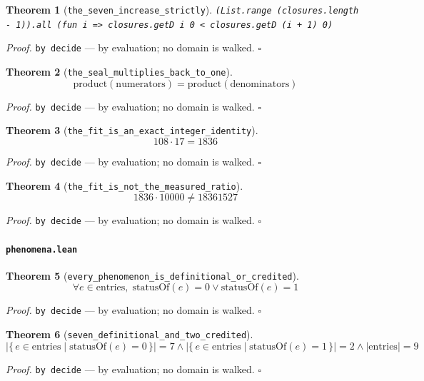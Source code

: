 \documentclass[11pt]{article}
\newtheorem{theorem}{Theorem}[section]
\begin{document}
\begin{theorem}[\texttt{the\_seven\_increase\_strictly}]
\texttt{(List.range (closures.length - 1)).all (fun i => closures.getD i 0 < closures.getD (i + 1) 0)}
\end{theorem}
\noindent\emph{Proof.} \texttt{by decide} --- by evaluation; no domain is walked. \hfill$\square$

\begin{theorem}[\texttt{the\_seal\_multiplies\_back\_to\_one}]
\[ \mathrm{product}\mathopen{}\left(\mathrm{numerators}\right) = \mathrm{product}\mathopen{}\left(\mathrm{denominators}\right) \]
\end{theorem}
\noindent\emph{Proof.} \texttt{by decide} --- by evaluation; no domain is walked. \hfill$\square$

\begin{theorem}[\texttt{the\_fit\_is\_an\_exact\_integer\_identity}]
\[ 108 \cdot 17 = 1836 \]
\end{theorem}
\noindent\emph{Proof.} \texttt{by decide} --- by evaluation; no domain is walked. \hfill$\square$

\begin{theorem}[\texttt{the\_fit\_is\_not\_the\_measured\_ratio}]
\[ 1836 \cdot 10000 \neq 18361527 \]
\end{theorem}
\noindent\emph{Proof.} \texttt{by decide} --- by evaluation; no domain is walked. \hfill$\square$

\paragraph{\texttt{phenomena.lean}}

\begin{theorem}[\texttt{every\_phenomenon\_is\_definitional\_or\_credited}]
\[ \forall e \in \mathrm{entries},\; \mathrm{statusOf}\mathopen{}\left(e\right) = 0 \lor \mathrm{statusOf}\mathopen{}\left(e\right) = 1 \]
\end{theorem}
\noindent\emph{Proof.} \texttt{by decide} --- by evaluation; no domain is walked. \hfill$\square$

\begin{theorem}[\texttt{seven\_definitional\_and\_two\_credited}]
\[ \left|\{\, e \in \mathrm{entries} \mid \mathrm{statusOf}\mathopen{}\left(e\right) = 0 \,\}\right| = 7 \land \left|\{\, e \in \mathrm{entries} \mid \mathrm{statusOf}\mathopen{}\left(e\right) = 1 \,\}\right| = 2 \land \left|\mathrm{entries}\right| = 9 \]
\end{theorem}
\noindent\emph{Proof.} \texttt{by decide} --- by evaluation; no domain is walked. \hfill$\square$
\end{document}
